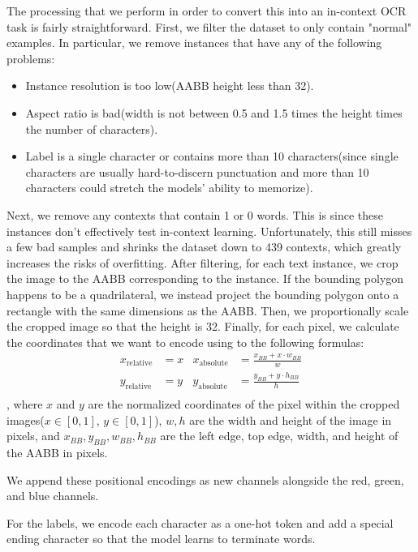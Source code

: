 The processing that we perform in order to convert this into an in-context OCR
task is fairly straightforward.
First, we filter the dataset to only contain "normal" examples. In particular,
we remove instances that have any of the following problems:
\begin{itemize}
    \item Instance resolution is too low(AABB height less than 32).
    \item Aspect ratio is bad(width is not between 0.5 and 1.5 times the height
    times the number of characters).
    \item Label is a single character or contains more than 10 characters(since
    single characters are usually hard-to-discern punctuation and more than 10
    characters could stretch the models' ability to memorize).
\end{itemize}
Next, we remove any contexts that contain 1 or 0 words. This is since these
instances don't effectively test in-context learning.
Unfortunately, this still misses a few bad samples and shrinks the dataset down
to 439 contexts, which greatly increases the risks of overfitting.
After filtering, for each text instance, we crop the image to the AABB corresponding to
the instance.
If the bounding polygon happens to be a quadrilateral, we instead project the
bounding polygon onto a rectangle with the same dimensions as the AABB.
Then, we proportionally scale the cropped image so that the height is 32.
Finally, for each pixel, we calculate the coordinates that we want to encode
using to the following formulas:
\begin{align*}
    x_{\text{relative}} &= x & x_{\text{absolute}} &= \frac{x_{BB} + x \cdot w_{BB}}{w}\\
    y_{\text{relative}} &= y & y_{\text{absolute}} &= \frac{y_{BB} + y \cdot h_{BB}}{h}\\
\end{align*}
, where $x$ and $y$ are the normalized coordinates of the pixel within the cropped
images($x \in [0, 1]$, $y \in [0, 1]$), $w, h$ are the width and height of the
image in pixels, and $x_{BB}, y_{BB}, w_{BB}, h_{BB}$ are the left edge, top
edge, width, and height of the AABB in pixels.

We append these positional encodings as new channels alongside the red, green,
and blue channels.

For the labels, we encode each character as a one-hot token and add a special
ending character so that the model learns to terminate words.


